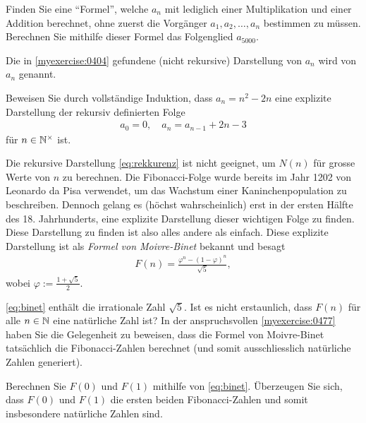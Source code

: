 \begin{myexercise}\label{myexercise:0404}
	Finden Sie eine \enquote{Formel}, welche $a_n$ mit lediglich einer Multiplikation und einer Addition berechnet, ohne zuerst die Vorgänger $a_{1}, a_{2}, \ldots, a_{n}$ bestimmen zu müssen. Berechnen Sie mithilfe dieser Formel das Folgenglied $a_{5000}$.
\end{myexercise}
\noindent
Die in \cref{myexercise:0404} gefundene (nicht rekursive) Darstellung von $a_n$ wird  von $a_n$ genannt.

\begin{myexercise}\label{myexercise:0405}
	Beweisen Sie durch vollständige Induktion, dass $a_n = n^2 -2n$ eine explizite Darstellung der rekursiv definierten Folge
	\begin{align*}
		a_0 = 0, \quad a_{n} = a_{n-1} + 2n - 3
	\end{align*}
	für $n\in\mathbb{N}^{\times}$ ist.
\end{myexercise}
\noindent
Die rekursive Darstellung \cref{eq:rekkurenz} ist nicht geeignet, um $N(n)$ für grosse Werte von $n$ zu berechnen. Die Fibonacci-Folge wurde bereits im  Jahr 1202 von Leonardo da Pisa verwendet, um das Wachstum einer Kaninchenpopulation zu beschreiben. Dennoch gelang es (höchst wahrscheinlich) erst in der ersten Hälfte des 18. Jahrhunderts, eine explizite Darstellung dieser wichtigen Folge zu finden. Diese Darstellung zu finden ist also alles andere als einfach. Diese explizite Darstellung ist als \textit{Formel von Moivre-Binet} bekannt und besagt
\begin{align}\label{eq:binet}
	F(n) = \frac{\varphi^n - (1-\varphi)^n}{\sqrt{5}},
\end{align}
wobei $\varphi := \frac{1+\sqrt{5}}{2}$.

\cref{eq:binet} enthält die irrationale Zahl $\sqrt{5}$. Ist es nicht erstaunlich, dass $F(n)$ für alle $n\in\mathbb{N}$ eine natürliche Zahl ist? In der anspruchsvollen \cref{myexercise:0477} haben Sie die Gelegenheit zu beweisen, dass die Formel von Moivre-Binet tatsächlich die Fibonacci-Zahlen berechnet (und somit ausschliesslich natürliche Zahlen generiert).

\begin{myexercise}\label{myexercise:0478}
	Berechnen Sie $F(0)$ und $F(1)$ mithilfe von \cref{eq:binet}. Überzeugen Sie sich, dass $F(0)$ und $F(1)$ die ersten beiden Fibonacci-Zahlen und somit insbesondere natürliche Zahlen sind.
\end{myexercise}

